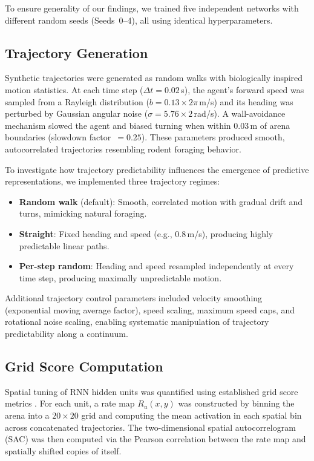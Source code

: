 \documentclass[11pt]{article}
\begin{document}
To ensure generality of our findings, we trained five independent networks with different random seeds (Seeds~0--4), all using identical hyperparameters.


\subsection*{Trajectory Generation}

Synthetic trajectories were generated as random walks with biologically inspired motion statistics. At each time step ($\Delta t = 0.02$\,s), the agent's forward speed was sampled from a Rayleigh distribution ($b = 0.13 \times 2\pi$\,m/s) and its heading was perturbed by Gaussian angular noise ($\sigma = 5.76 \times 2$\,rad/s). A wall-avoidance mechanism slowed the agent and biased turning when within 0.03\,m of arena boundaries (slowdown factor~$= 0.25$). These parameters produced smooth, autocorrelated trajectories resembling rodent foraging behavior.

To investigate how trajectory predictability influences the emergence of predictive representations, we implemented three trajectory regimes:
\begin{itemize}
    \item \textbf{Random walk} (default): Smooth, correlated motion with gradual drift and turns, mimicking natural foraging.
    \item \textbf{Straight}: Fixed heading and speed (e.g., 0.8\,m/s), producing highly predictable linear paths.
    \item \textbf{Per-step random}: Heading and speed resampled independently at every time step, producing maximally unpredictable motion.
\end{itemize}

Additional trajectory control parameters included velocity smoothing (exponential moving average factor), speed scaling, maximum speed caps, and rotational noise scaling, enabling systematic manipulation of trajectory predictability along a continuum.


\subsection*{Grid Score Computation}

Spatial tuning of RNN hidden units was quantified using established grid score metrics \cite{sargolini2006,langston2010}. For each unit, a rate map $R_u(x,y)$ was constructed by binning the arena into a $20 \times 20$ grid and computing the mean activation in each spatial bin across concatenated trajectories. The two-dimensional spatial autocorrelogram (SAC) was then computed via the Pearson correlation between the rate map and spatially shifted copies of itself.
\end{document}
